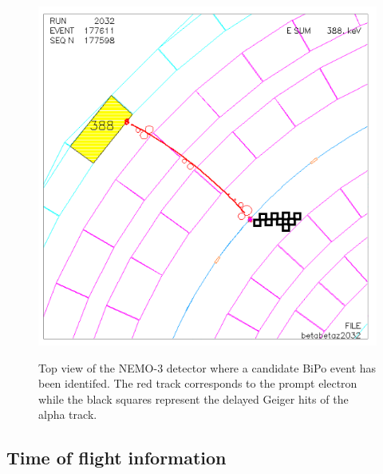 \documentclass[main.tex]{subfiles}
\begin{document}
\begin{figure}[h!]
\centering
\includegraphics[scale=0.4]{pictures/Chap6/alphaIdentification.png}
\label{AlphaNEMO3}
\caption{Top view of the NEMO-3 detector where a candidate BiPo event has been identifed. The red track corresponds to the prompt electron while the black squares represent the delayed Geiger hits of the alpha track.}
\end{figure}


\FloatBarrier

\subsection{Time of flight information}\label{sec:TOFanalysis}
\end{document}
